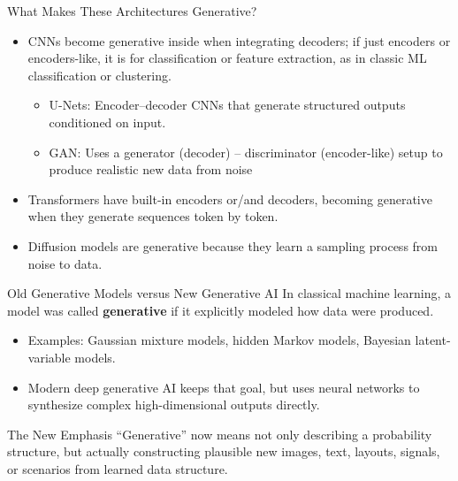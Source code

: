 \documentclass[12pt]{beamer}
\begin{document}
\begin{frame}{What Makes These Architectures Generative?}

  \begin{itemize}
    \item CNNs become generative inside when integrating decoders; if just encoders or encoders-like, it is for classification or feature extraction, as in classic ML classification or clustering. 
    
  \begin{itemize}
        \item U-Nets: Encoder–decoder CNNs that generate structured outputs conditioned on input.
        \item GAN: Uses a generator (decoder) – discriminator (encoder-like) setup to produce realistic new data from noise
    \end{itemize}
    
    \item Transformers have built-in encoders or/and decoders, becoming generative when they generate sequences token by token.
    \item Diffusion models are generative because they learn a sampling process from noise to data.
  \end{itemize}
  
\end{frame}

\begin{frame}{Old Generative Models versus New Generative AI}
  In classical machine learning, a model was called \textbf{generative} if it explicitly modeled how data were produced.

  \begin{itemize}
    \item Examples: Gaussian mixture models, hidden Markov models, Bayesian latent-variable models.
    \item Modern deep generative AI keeps that goal, but uses neural networks to synthesize complex high-dimensional outputs directly.
  \end{itemize}

  \begin{conceptbox}{The New Emphasis}
    ``Generative'' now means not only describing a probability structure, but actually constructing plausible new images, text, layouts, signals, or scenarios from learned data structure.
  \end{conceptbox}
\end{frame}
\end{document}
